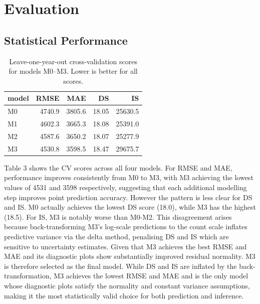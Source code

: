 \documentclass[
]{article}
\begin{document}
\section{Evaluation}\label{evaluation}

\subsection{Statistical Performance}\label{statistical-performance}

\begin{table}

\caption{\label{tab:unnamed-chunk-3}Leave-one-year-out cross-validation scores for models M0--M3. Lower is better for all scores.}
\centering
\begin{tabular}[t]{lrrrr}
\toprule
model & RMSE & MAE & DS & IS\\
\midrule
M0 & 4740.9 & 3805.6 & 18.05 & 25630.5\\
M1 & 4602.3 & 3665.3 & 18.08 & 25391.0\\
M2 & 4587.6 & 3650.2 & 18.07 & 25277.9\\
M3 & 4530.8 & 3598.5 & 18.47 & 29675.7\\
\bottomrule
\end{tabular}
\end{table}

Table 3 shows the CV scores across all four models. For RMSE and MAE, performance improves consistently from M0 to M3, with M3 achieving the
lowest values of 4531 and 3598 respectively, suggesting that each additional modelling step improves point prediction accuracy. However
the pattern is less clear for DS and IS. M0 actually achieves the lowest DS score (18.0), while M3 has the highest (18.5). For IS, M3 is notably
worse than M0-M2. This disagreement arises because back-transforming M3's log-scale predictions to the count scale inflates predictive variance via
the delta method, penalising DS and IS which are sensitive to uncertainty estimates. Given that M3 achieves the best RMSE and MAE and its diagnostic plots show substantially improved residual normality. M3 is therefore selected as the final model. While DS and IS are inflated by the back-transformation, M3 achieves the lowest RMSE and MAE and is the only model whose diagnostic plots satisfy the normality and constant variance assumptions, making it the most statistically valid choice for both prediction and inference.
\end{document}
